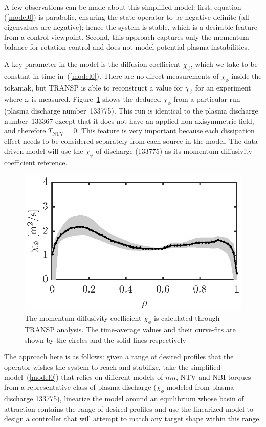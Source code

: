 \documentclass{iopart}
\begin{document}
A few observations can be made about this simplified model: first, equation  (\ref{model0}) is parabolic, ensuring the state operator to be negative definite (all eigenvalues are negative);  hence the system is stable, which is a desirable feature from a control viewpoint. 
Second, this approach captures only the momentum balance for rotation control and does not model potential plasma instabilities.
  
A key parameter in the model is the diffusion coefficient $\chi_\phi$, which we
take to be constant in time in~(\ref{model0}).
There are no direct measurements of $\chi_\phi$ inside the tokamak, but TRANSP
is able to reconstruct a value for $\chi_\phi$ for an experiment where $\omega$
is measured.
%
Figure~{\ref{fig:chiphi}} shows the deduced $\chi_\phi$ from a particular run (plasma discharge number~133775). This run is identical to the plasma discharge number~133367 except that it does not have an applied non-axisymmetric field, and therefore $T_\text{NTV} = 0$. This feature is very important because each dissipation effect needs to be considered separately from each source in the model. The data driven model will use the $\chi_\phi$ of discharge (133775) as its momentum diffusivity coefficient reference.


\begin{figure}
\centering
\includegraphics{fig2} %
\caption{The momentum diffusivity coefficient $ \chi_{\phi}$ is calculated through TRANSP analysis. The time-average values and their curve-fits are shown by the circles  and the solid lines respectively}
\label{fig:chiphi}
\end{figure}


The approach here is as follows: given a range of desired profiles that
the operator wishes the system to reach and stabilize,
take the simplified model~(\ref{model0}) that relies on different models of $ n  m$,
NTV and NBI torques from a representative class of plasma discharge ($\chi_\phi$ modeled from plasma discharge 133775),
linearize the model around an equilibrium whose basin of attraction contains the range of desired profiles
and use the linearized model to design a controller that will attempt to match any target shape within this range.
\end{document}
